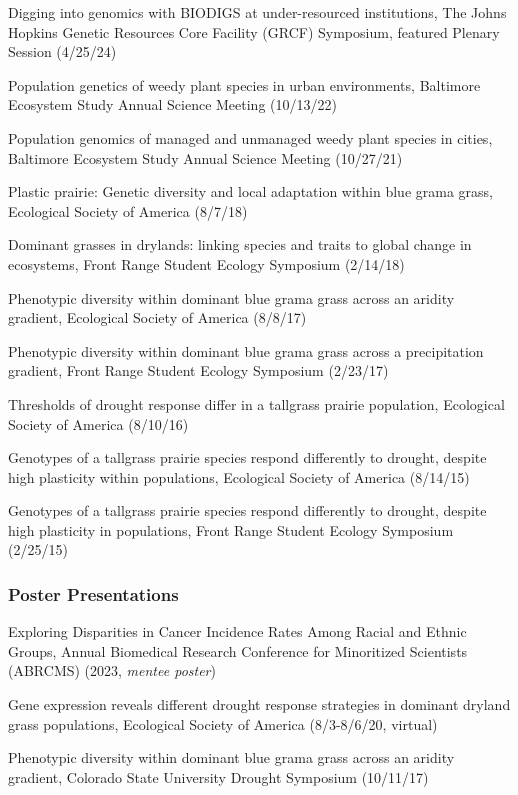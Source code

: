 \documentclass{cv}
\begin{document}
Digging into genomics with BIODIGS at under-resourced institutions, The Johns Hopkins Genetic Resources Core Facility (GRCF) Symposium, featured Plenary Session (4/25/24)

Population genetics of weedy plant species in urban environments, Baltimore Ecosystem Study Annual Science Meeting (10/13/22)

Population genomics of managed and unmanaged weedy plant species in cities, Baltimore Ecosystem Study Annual Science Meeting (10/27/21)

Plastic prairie: Genetic diversity and local adaptation within blue grama grass, Ecological Society of America (8/7/18)

Dominant grasses in drylands: linking species and traits to global change in ecosystems, Front Range Student Ecology Symposium (2/14/18)

Phenotypic diversity within dominant blue grama grass across an aridity gradient, Ecological Society of America (8/8/17)

Phenotypic diversity within dominant blue grama grass across a precipitation gradient, Front Range Student Ecology Symposium (2/23/17)

Thresholds of drought response differ in a tallgrass prairie population, Ecological Society of America (8/10/16)

Genotypes of a tallgrass prairie species respond differently to drought, despite high plasticity within populations, Ecological Society of America (8/14/15)

Genotypes of a tallgrass prairie species respond differently to drought, despite high plasticity in populations, Front Range Student Ecology Symposium (2/25/15)

\subsubsection*{Poster Presentations}

Exploring Disparities in Cancer Incidence Rates Among Racial and Ethnic Groups, Annual Biomedical Research Conference for Minoritized Scientists (ABRCMS) (2023, \textit{mentee poster})

Gene expression reveals different drought response strategies in dominant dryland grass populations, Ecological Society of America (8/3-8/6/20, virtual)

Phenotypic diversity within dominant blue grama grass across an aridity gradient, Colorado State University Drought Symposium (10/11/17)
\end{document}
